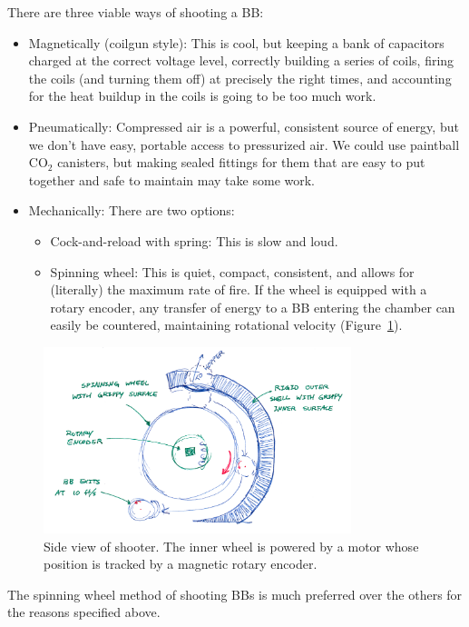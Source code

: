 \documentclass[10pt,letterpaper]{article}
\begin{document}
There are three viable ways of shooting a BB:

\begin{itemize}
	\item Magnetically (coilgun style): This is cool, but keeping a bank of
		capacitors charged at the correct voltage level, correctly building
		a series of coils, firing the coils (and turning them off) at precisely
		the right times, and accounting for the heat buildup in the coils is
		going to be too much work.
	\item Pneumatically: Compressed air is a powerful, consistent source of
		energy, but we don't have easy, portable access to pressurized air. We
		could use paintball CO$_2$ canisters, but making sealed fittings for
		them that are easy to put together and safe to maintain may take some
		work.
	\item Mechanically: There are two options:
		\begin{itemize}
			\item Cock-and-reload with spring: This is slow and loud.
			\item Spinning wheel: This is quiet, compact, consistent, and
				allows for (literally) the maximum rate of fire. If the wheel
				is equipped with a rotary encoder, any transfer of energy to
				a BB entering the chamber can easily be countered, maintaining
				rotational velocity (Figure~\ref{fig:shooter}).
		\end{itemize}
\end{itemize}

\begin{figure}[!h]
	\centering
	\includegraphics[width=0.8\textwidth]{shooter_side.png}
	\caption{Side view of shooter. The inner wheel is powered by a motor whose
	position is tracked by a magnetic rotary encoder.}
	\label{fig:shooter}
\end{figure}

The spinning wheel method of shooting BBs is much preferred over the others for
the reasons specified above.
\end{document}
